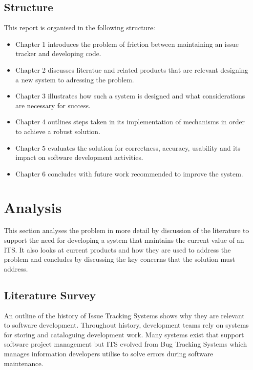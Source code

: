 \documentclass{mproj}
\begin{document}
\section{Structure}

This report is organised in the following structure:
\begin{itemize}
  \item Chapter 1 introduces the problem of friction between maintaining an issue tracker and developing code.
  \item Chapter 2 discusses literatue and related products that are relevant designing a new system to adressing the problem.
  \item Chapter 3 illustrates how such a system is designed and what considerations are necessary for success.
  \item Chapter 4 outlines steps taken in its implementation of mechanisms in order to achieve a robust solution.
  \item Chapter 5 evaluates the solution for correctness, accuracy, usability and its impact on software development activities.
  \item Chapter 6 concludes with future work recommended to improve the system.
\end{itemize}


\chapter{Analysis}\label{analysis}

This section analyses the problem in more detail by discussion of the literature to support the need for developing a system that maintains the current value of an ITS. It also looks at current products and how they are used to address the problem and concludes by discussing the key concerns that the solution must address.


\section{Literature Survey}  

An outline of the history of Issue Tracking Systems shows why they are relevant to software development. Throughout history, development teams rely on systems for storing and cataloguing development work. Many systems exist that support software project management but ITS evolved from Bug Tracking Systems which manages information developers utilise to solve errors during software maintenance.
\end{document}
